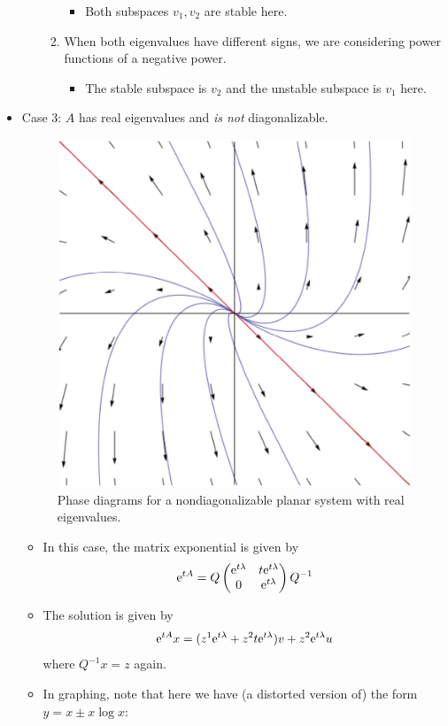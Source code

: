 \documentclass[../notes.tex]{subfiles}
\begin{document}
\begin{itemize}
\begin{itemize}
\begin{enumerate}
            \begin{itemize}
                \item Both subspaces $v_1,v_2$ are stable here.
            \end{itemize}
            \item When both eigenvalues have different signs, we are considering power functions of a negative power.
            \begin{itemize}
                \item The stable subspace is $v_2$ and the unstable subspace is $v_1$ here.
            \end{itemize}
        \end{enumerate}
    \end{itemize}
    \item Case 3: $A$ has real eigenvalues and \emph{is not} diagonalizable.
    \begin{figure}[h!]
        \centering
        \includegraphics[width=0.256\linewidth]{../ExtFiles/planarRealNon.png}
        \caption{Phase diagrams for a nondiagonalizable planar system with real eigenvalues.}
        \label{fig:planarRealNon}
    \end{figure}
    \begin{itemize}
        \item In this case, the matrix exponential is given by
        \begin{equation*}
            \e[tA] = Q
            \begin{pmatrix}
                \e[t\lambda] & t\e[t\lambda]\\
                0 & \e[t\lambda]\\
            \end{pmatrix}
            Q^{-1}
        \end{equation*}
        \item The solution is given by
        \begin{equation*}
            \e[tA]x = (z^1\e[t\lambda]+z^2t\e[t\lambda])v+z^2\e[t\lambda]u
        \end{equation*}
        where $Q^{-1}x=z$ again.
        \item In graphing, note that here we have (a distorted version of) the form $y=x\pm x\log x$:

\end{itemize}
\end{itemize}
\end{document}
